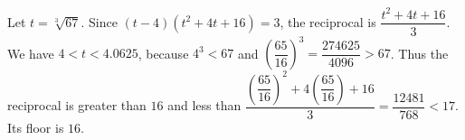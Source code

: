 Let $t=\sqrt[3]{67}$. Since $(t-4)(t^2+4t+16)=3$, the reciprocal is $\dfrac{t^2+4t+16}{3}$. We have $4<t<4.0625$, because $4^3<67$ and $(\dfrac{65}{16})^3 = \dfrac{274625}{4096} > 67$. Thus the reciprocal is greater than $16$ and less than $\dfrac{(\dfrac{65}{16})^2 + 4 (\dfrac{65}{16}) + 16}{3} = \dfrac{12481}{768} < 17$. Its floor is $\boxed{16}$.

